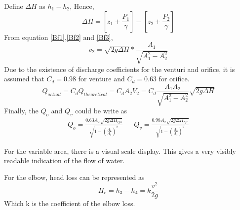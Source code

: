 Define $\Delta H$ as $h_1 - h_2 $, Hence,
\begin{equation}
    \Delta H=\left[z_1+\frac{P_1}{\gamma}\right]-\left[z_2+\frac{P_2}{\gamma}\right]
    \label{Be3}
\end{equation}
From equation \eqref{Bf1},\eqref{Bf2} and \eqref{Bf3}, 
\begin{equation}
    v_2=\sqrt{2g\Delta H}*\frac{A_1}{\sqrt{A_1^2-A_2^2}}
    \label{Be4}
\end{equation}
Due to the existence of discharge coefficients for the venturi and orifice, 
it is assumed that $C_d=0.98$ for venture and $C_d=0.63$ for orifice.
\begin{equation}
    Q_{actual}=C_d Q_{theoretical}=C_dA_2V_2=C_d\frac{A_1A_2}{\sqrt{A_1^2-A_2^2}}\sqrt{2g\Delta H}
    \label{Be5}
\end{equation}
Finally, the $Q_o$ and $Q_v$ could be write as
\begin{align}
   Q_o=\frac{0.63A_2\sqrt{2g\Delta H_{Qo}}}{\sqrt{1-(\frac{A_2}{A_1})^2}} &   & Q_v=\frac{0.98A_2\sqrt{2g\Delta H_{Qv}}}{\sqrt{1-(\frac{A_2}{A_1})^2}}
    \label{Be6}
\end{align}
 
For the variable area, there is a visual scale display.
This gives a very visibly readable indication of the flow of water.

For the elbow, head loss can be represented as 
\begin{equation}
    H_e=h_3-h_4=k\frac{v^2}{2g}
    \label{Be8}
\end{equation}
Which k is the coefficient of the elbow loss.

